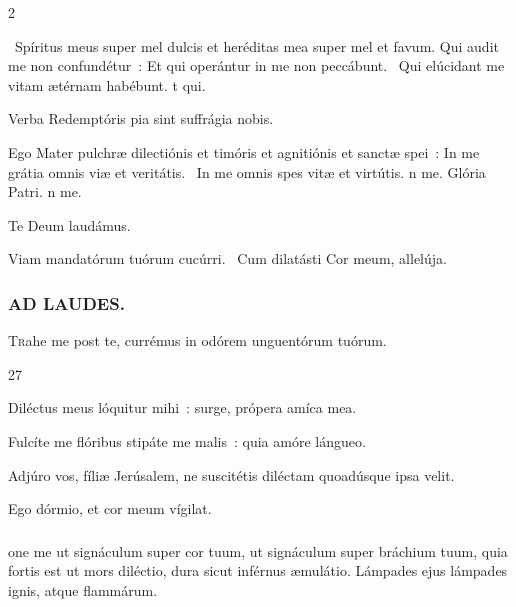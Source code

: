 \documentclass[9pt,twoside]{extarticle}
\begin{document}
\begin{multicols}{2}
{\begin{tightlist}{}
\item {}~Spíritus meus super mel dulcis et heréditas mea super mel et favum. Qui audit me non confundétur~: \textred{*} Et qui operántur in me non peccábunt. ~Qui elúcidant me vitam ætérnam habébunt. t qui.
\item {} Verba Redemptóris pia sint suffrágia nobis.
\item {} Ego Mater pulchræ dilectiónis et timóris et agnitiónis et sanctæ spei~: \textred{*} In me grátia omnis viæ et veritátis. ~In me omnis spes vitæ et virtútis. n me. Glória Patri. n me.
\item Te Deum laudámus.
\item {} Viam mandatórum tuórum cucúrri. ~Cum dilatásti Cor meum, allelúja.
\end{tightlist}

\subsubsection*{\center \textsc{AD LAUDES.}}
\begin{center}\end{center}
\lettrine{T}rahe me post te, currémus in odórem unguentórum tuórum.

\begin{tightlist}{}
\item {} 27
\item {} Diléctus meus lóquitur mihi~: surge, própera amíca mea.
\item {} Fulcíte me flóribus stipáte me malis~: quia amóre lángueo.
\item {} Adjúro vos, fíliæ Jerúsalem, ne suscitétis diléctam quoadúsque ipsa velit.
\item {} Ego dórmio, et cor meum vígilat.
\end{tightlist}

\subsubsection*{}
one me ut signáculum super cor tuum, ut signáculum super bráchium tuum, quia fortis est ut mors diléctio, dura sicut inférnus æmulátio. Lámpades ejus lámpades ignis, atque flammárum.

}
\end{multicols}
\end{document}
